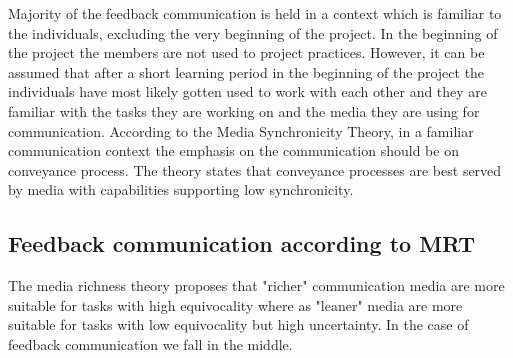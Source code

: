 \documentclass[conference]{IEEEtran}
\begin{document}
Majority of the feedback communication is held in a context which is familiar to the individuals, excluding the very beginning of the project. In the beginning of the project the members are not used to project practices. However, it can be assumed that after a short learning period in the beginning of the project the individuals have most likely gotten used to work with each other and they are familiar with the tasks they are working on and the media they are using for communication. According to the Media Synchronicity Theory, in a familiar communication context the emphasis on the communication should be on conveyance process. The theory states that conveyance processes are best served by media with capabilities supporting low synchronicity.

\subsection{Feedback communication according to MRT}

The media richness theory proposes that "richer" communication media are more suitable for tasks with high equivocality where as "leaner" media are more suitable for tasks with low equivocality but high uncertainty. \cite{1999dennis} In the case of feedback communication we fall in the middle.
\end{document}
